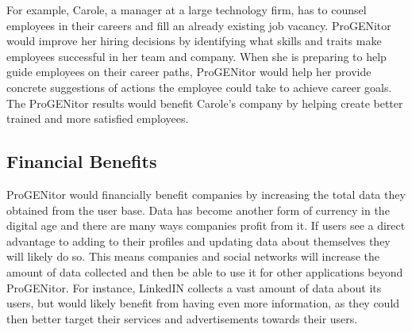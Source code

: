 For example, Carole, a manager at a large technology firm, has to counsel
employees in their careers and fill an already existing job vacancy.  ProGENitor would
improve her hiring decisions by identifying what skills and traits make
employees successful in her team and company.  When she is preparing to help
guide employees  on their career paths, ProGENitor would help her provide
concrete suggestions of actions the employee could take to achieve career goals.
The ProGENitor results  would benefit Carole's company by helping create better
trained and more satisfied employees.

\subsection{Financial Benefits}
ProGENitor would financially benefit companies by increasing the total data
they obtained from the user base.  Data has become another form of currency in
the digital age and there are many ways companies profit from it.  If users see
a direct advantage to adding to their profiles and updating data about
themselves they will likely do so.  This means companies and social networks
will increase the amount of data collected and then be able to use it for other
applications beyond ProGENitor.  For instance, LinkedIN collects a vast amount
of data about its users, but would likely benefit from having even more
information, as they could then better target their services and advertisements
towards their users.
